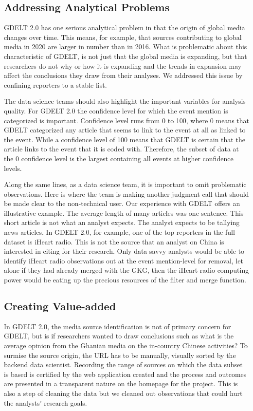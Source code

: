 \documentclass[preprint,authoryear,12pt]{elsarticle/elsarticle}
\begin{document}
\subsection{Addressing Analytical Problems} 
\label{sec:problems}
GDELT 2.0 has one serious analytical problem in that the origin of global media changes over time. This means, for example, that sources contributing to global media in 2020 are larger in number than in 2016. What is problematic about this characteristic of GDELT, is not just that the global media is expanding, but that researchers do not why or how it is expanding and the trends in expansion may affect the conclusions they draw from their analyses. We addressed this issue by confining reporters to a stable list. 

The data science teams should also highlight the important variables for analysis quality. For GDELT 2.0 the confidence level for which the event mention is categorized is important. Confidence level runs from 0 to 100, where 0 means that GDELT categorized any article that seems to link to the event at all as linked to the event. While a confidence level of 100 means that GDELT is certain that the article links to the event that it is coded with. Therefore, the subset of data at the 0 confidence level is the largest containing all events at higher confidence levels.  

Along the same lines, as a data science team, it is important to omit problematic observations. Here is where the team is making another judgment call that should be made clear to the non-technical user. Our experience with GDELT offers an illustrative example. The average length of many articles was one sentence. This short article is not what an analyst expects. The analyst expects to be tallying news articles. In GDELT 2.0, for example, one of the top reporters in the full dataset is iHeart radio. This is not the source that an analyst on China is interested in citing for their research. Only data-savvy analysts would be able to identify iHeart radio observations out at the event mention-level for removal, let alone if they had already merged with the GKG, then the iHeart radio computing power would be eating up the precious resources of the filter and merge function. 

\subsection{Creating Value-added}
In GDELT 2.0, the media source identification is not of primary concern for GDELT, but is if researchers wanted to draw conclusions such as what is the average opinion from the Ghanian media on the in-country Chinese activities? To surmise the source origin, the URL has to be manually, visually sorted by the backend data scientist. Recording the range of sources on which the data subset is based is certified by the web application created and the process and outcomes are presented in a transparent nature on the homepage for the project. This is also a step of cleaning the data but we cleaned out observations that could hurt the analysts’ research goals.
\end{document}
